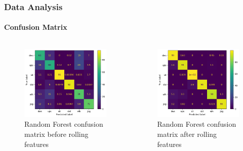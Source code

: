 \documentclass[
	11pt, %
]{beamer}
\begin{document}
\begin{frame}
    \frametitle{Data Analysis}
    \framesubtitle{Confusion Matrix}

    \begin{columns}
        \begin{figure}[]
            \includegraphics[width=0.9\linewidth]{cm_rtc_before.png}
            \caption{Random Forest confusion matrix before rolling features}
        \end{figure}

        \begin{figure}
            \includegraphics[width=0.9\linewidth]{cm_rtc_after.png}
            \caption{Random Forest confusion matrix after rolling features}
        \end{figure}
    \end{columns}
\end{frame}
\end{document}
